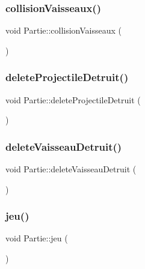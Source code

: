 \mbox{\label{class_partie_a97ce349fac7e91f3cd8cc2a547a35239}} 
\subsubsection{\texorpdfstring{collision\+Vaisseaux()}{collisionVaisseaux()}}
{\footnotesize\ttfamily void Partie\+::collision\+Vaisseaux (\begin{DoxyParamCaption}{ }\end{DoxyParamCaption})}

\mbox{\label{class_partie_a88b2fa21d16b97fc120ea4d0e35208af}} 
\subsubsection{\texorpdfstring{delete\+Projectile\+Detruit()}{deleteProjectileDetruit()}}
{\footnotesize\ttfamily void Partie\+::delete\+Projectile\+Detruit (\begin{DoxyParamCaption}{ }\end{DoxyParamCaption})}

\mbox{\label{class_partie_ae3caf4ac1e50ac945783b1a0d79a85c7}} 
\subsubsection{\texorpdfstring{delete\+Vaisseau\+Detruit()}{deleteVaisseauDetruit()}}
{\footnotesize\ttfamily void Partie\+::delete\+Vaisseau\+Detruit (\begin{DoxyParamCaption}{ }\end{DoxyParamCaption})}

\mbox{\label{class_partie_a38d54358098b3e5e47d0059a37bff5ea}} 
\subsubsection{\texorpdfstring{jeu()}{jeu()}}
{\footnotesize\ttfamily void Partie\+::jeu (\begin{DoxyParamCaption}{ }\end{DoxyParamCaption})}

